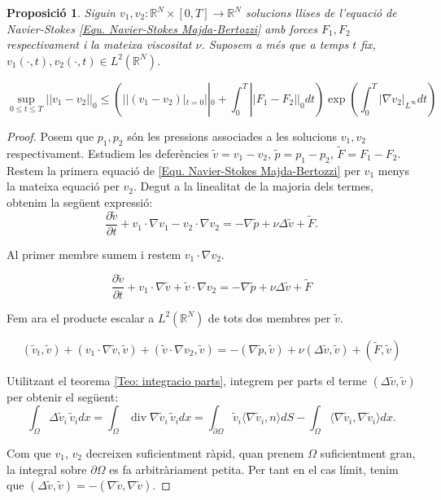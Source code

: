 \documentclass{article}
\numberwithin{equation}{section}
\DeclareMathOperator{\diver}{div}
\newtheorem{proposicio}{Proposici\'{o}}[section]
\begin{document}
\begin{proposicio}\label{Pro: unicitat}
Siguin $v_1,v_2:\mathbb{R}^N\times[0,T]\rightarrow\mathbb{R}^N$ solucions llises de l'equaci\'{o} de Navier-Stokes \eqref{Equ. Navier-Stokes Majda-Bertozzi} amb forces $F_1,F_2$ respectivament i la mateixa viscositat $\nu$. Suposem a m\'{e}s que a temps $t$ fix, $v_1(\cdot,t),v_2(\cdot,t)\in L^2(\mathbb{R}^N)$.

\begin{equation}\label{Equ. unicitat}
\sup_{0\leq t\leq T}||v_1-v_2||_0\leq\left(||(v_1-v_2)|_{t=0}||_0+\int_0^T||F_1-F_2||_0dt\right)\exp\left(\int_0^T|\nabla v_2|_{L^{\infty}}dt\right)
\end{equation}
\end{proposicio}
\begin{proof}
Posem que $p_1,p_2$ s\'{o}n les pressions associades a les solucions $v_1,v_2$ respectivament. Estudiem les defer\`{e}ncies $\tilde{v}=v_1-v_2$, $\tilde{p}=p_1-p_2$, $\tilde{F}=F_1-F_2$. Restem la primera equaci\'{o} de \eqref{Equ. Navier-Stokes Majda-Bertozzi} per $v_1$ menys la mateixa equaci\'{o} per $v_2$. Degut a la linealitat de la majoria dels termes, obtenim la seg\"{u}ent expressi\'{o}:
\[\frac{\partial\tilde{v}}{\partial t}+v_1\cdot\nabla v_1-v_2\cdot\nabla v_2=-\nabla\tilde{p}+\nu\Delta\tilde{v}+\tilde{F}.\]

Al primer membre sumem i restem $v_1\cdot\nabla v_2$.

\[\frac{\partial\tilde{v}}{\partial t}+v_1\cdot\nabla\tilde{v}+\tilde{v}\cdot\nabla v_2=-\nabla\tilde{p}+\nu\Delta\tilde{v}+\tilde{F}\]

Fem ara el producte escalar a $L^2(\mathbb{R}^N)$ de tots dos membres per $\tilde{v}$.

\[(\tilde{v}_t,\tilde{v})+(v_1\cdot\nabla\tilde{v},\tilde{v})+(\tilde{v}\cdot\nabla v_2,\tilde{v})=-(\nabla\tilde{p},\tilde{v})+\nu(\Delta\tilde{v},\tilde{v})+(\tilde{F},\tilde{v})\]

Utilitzant el teorema \ref{Teo: integracio parts}, integrem per parts el terme $(\Delta\tilde{v},\tilde{v})$ per obtenir el seg\"{u}ent:
\[\int_{\Omega}\Delta\tilde{v}_i\,\tilde{v}_idx=\int_{\Omega}\diver\nabla\tilde{v}_i\,\tilde{v}_idx=\int_{\partial\Omega}\tilde{v}_i\langle\nabla\tilde{v}_i,n\rangle dS-\int_{\Omega}\langle\nabla\tilde{v}_i,\nabla\tilde{v}_i\rangle dx.\]

Com que $v_1$, $v_2$ decreixen suficientment r\`{a}pid, quan prenem $\Omega$ suficientment gran, la integral sobre $\partial\Omega$ es fa arbitr\`{a}riament petita. Per tant en el cas l\'{i}mit, tenim que $(\Delta\tilde{v},\tilde{v})=-(\nabla\tilde{v},\nabla\tilde{v})$.


\end{proof}
\end{document}

